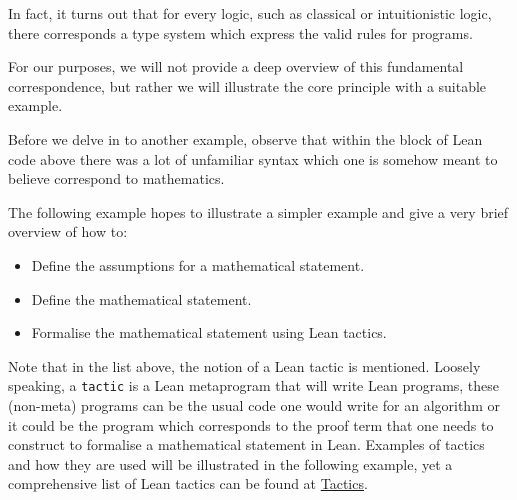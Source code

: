 In fact, it turns out that for every logic, such as classical or intuitionistic logic, there corresponds a type system which express the valid rules for programs. 

For our purposes, we will not provide a deep overview of this fundamental correspondence, but rather we will illustrate the core principle with a suitable example.

Before we delve in to another example, observe that within the block of Lean code above there was a lot of unfamiliar syntax which one is somehow meant to believe correspond to mathematics. 

The following example hopes to illustrate a simpler example and give a very brief overview of how to:

\begin{itemize}
    \item Define the assumptions for a mathematical statement.
    \item Define the mathematical statement.
    \item Formalise the mathematical statement using Lean tactics.
\end{itemize}

Note that in the list above, the notion of a Lean tactic is mentioned. Loosely speaking, a \texttt{tactic} is a Lean metaprogram that will write Lean programs, these (non-meta) programs can
be the usual code one would write for an algorithm or it could be the program which corresponds to the proof term that one needs to construct to formalise
a mathematical statement in Lean. Examples of tactics and how they are used will be illustrated in the following example, yet a comprehensive list of Lean tactics can be found at \href{https://lean-lang.org/doc/reference/latest//Tactic-Proofs/Tactic-Reference/}{Tactics}.

